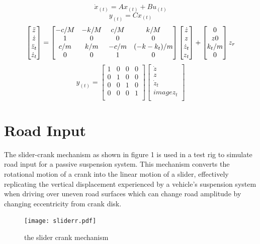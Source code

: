 $$\dot{x}_{(t)}=Ax_{(t)}+Bu_{(t)}$$
$$y_{(t)}=Cx_{(t)}$$
\begin{equation}
	\centering
	\begin{bmatrix}
		\ddot{z}   \\
		\dot{z}    \\
		\ddot{z}_t \\
		\dot{z}_t  \\
	\end{bmatrix}
	=
	\begin{bmatrix}
		-c/M & -k/M & c/M  & k/M        \\
		1    & 0    & 0    & 0          \\
		c/m  & k/m  & -c/m & (-k-k_t)/m \\
		0    & 0    & 1    & 0          \\
	\end{bmatrix}
	\begin{bmatrix}
		\dot{z}   \\
		z         \\
		\dot{z}_t \\
		z_t       \\
	\end{bmatrix}
	+
	\begin{bmatrix}
		0     \\
		z  0  \\
		k_t/m \\
		0     \\
	\end{bmatrix}
	z_r
	\label{eqn:ssm}
\end{equation}
$$
y_{(t)}=
\begin{bmatrix}
	1 & 0 & 0 & 0 \\
	0 & 1 & 0 & 0 \\
	0 & 0 & 1 & 0 \\
	0 & 0 & 0 & 1 \\
	
\end{bmatrix}
\begin{bmatrix}
	\dot{z}   \\
	z         \\
	\dot{z}_t \\image
	z_t       \\
\end{bmatrix}
$$


\section{Road Input}
The slider-crank mechanism as shown in figure 1 is used in a test rig to simulate road input for a passive suspension system. This mechanism converts the rotational motion of a crank into the linear motion of a slider, effectively replicating the vertical displacement experienced by a vehicle's suspension system when driving over uneven road surfaces which can change road amplitude by changing eccentricity from crank disk.
\begin{figure}[H]
	\centering
	\texttt{[image: sliderr.pdf]}
	\caption{the slider crank mechanism}
	\label{fig:sliderr}
\end{figure}


